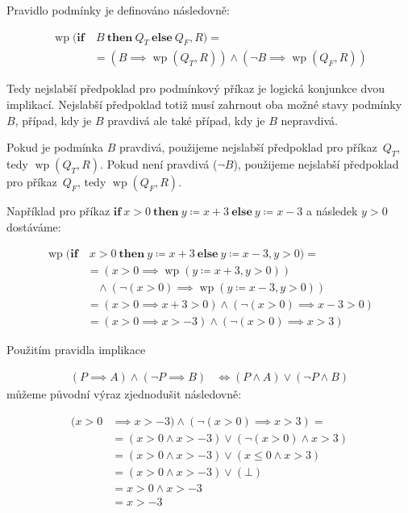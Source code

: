 Pravidlo podmínky je definováno následovně:

\begin{align*}
    \operatorname{wp}(\textbf{if} & \ B \ \textbf{then} \ Q_T \ \textbf{else} \ Q_F, R) = \\
                   & = (B \implies \operatorname{wp}(Q_T, R)) \land (\neg B \implies \operatorname{wp}(Q_F, R))
\end{align*}

Tedy nejslabší předpoklad pro podmínkový příkaz je logická konjunkce dvou implikací.
Nejslabší předpoklad totiž musí zahrnout oba možné stavy podmínky $B$, případ, kdy je $B$ pravdivá ale také případ, kdy je $B$ nepravdivá.

Pokud je podmínka $B$ pravdivá, použijeme nejslabší předpoklad pro příkaz~$Q_T$, tedy $\operatorname{wp}(Q_T, R)$.
Pokud není pravdivá ($\neg B$), použijeme nejslabší předpoklad pro příkaz~$Q_F$, tedy $\operatorname{wp}(Q_F, R)$.

Například pro příkaz $\textbf{if} \ x > 0 \ \textbf{then} \ y \coloneqq x + 3 \ \textbf{else} \ y \coloneqq x - 3$
a následek $y > 0$ dostáváme:

\begin{align*}
    \operatorname{wp}(\textbf{if} & \ x > 0 \ \textbf{then} \ y \coloneqq x + 3 \ \textbf{else} \ y \coloneqq x - 3, y > 0) = \\
          & = (x > 0 \implies \operatorname{wp}(y \coloneqq x + 3, y > 0)) \\
          & \ \ \ \ \land (\neg (x > 0) \implies \operatorname{wp}(y \coloneqq x - 3, y > 0)) \\
          & = (x > 0 \implies x + 3 > 0) \land (\neg (x > 0) \implies x - 3 > 0) \\
          & = (x > 0 \implies x > -3) \land (\neg (x > 0) \implies x > 3)
\end{align*}

Použitím pravidla implikace

\begin{align*}
    (P \implies A) \land (\neg P \implies B) & \iff (P \land A) \lor (\neg P \land B)
\end{align*}
můžeme původní výraz zjednodušit následovně:

\begin{align*}
    (x > 0 & \implies x > -3) \land (\neg (x > 0) \implies x > 3) = \\
           & = (x > 0 \land x > -3) \lor (\neg (x > 0) \land x > 3) \\
           & = (x > 0 \land x > -3) \lor (x \leq 0 \land x > 3) \\
           & = (x > 0 \land x > -3) \lor (\bot) \\
           & = x > 0 \land x > -3 \\
           & = x > -3
\end{align*}

